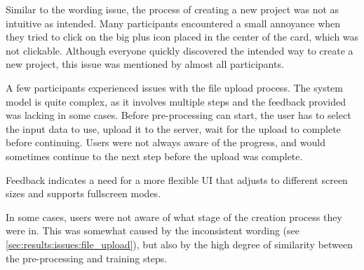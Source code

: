 
Similar to the wording issue, the process of creating a new project was not as intuitive as intended.
Many participants encountered a small annoyance when they tried to click on the big plus icon placed in the center of the card, which was not clickable. 
Although everyone quickly discovered the intended way to create a new project, this issue was mentioned by almost all participants.
\cite{P3, P4, P5, P6, P7, P8}


\label{sec:results:issues:file_upload}
A few participants experienced issues with the file upload process. 
\cite{P1, P4, P6}
The system model is quite complex, as it involves multiple steps and the feedback provided was lacking in some cases.
Before pre-processing can start, the user has to select the input data to use, upload it to the server, wait for the upload to complete before continuing.
Users were not always aware of the progress, and would sometimes continue to the next step before the upload was complete. 


Feedback indicates a need for a more flexible UI that adjusts to different screen sizes and supports fullscreen modes.
\cite{P10}

In some cases, users were not aware of what stage of the creation process they were in.
This was somewhat caused by the inconsistent wording (see \ref{sec:results:issues:file_upload}), but also by the high degree of similarity between the pre-processing and training steps.
\cite{P2}

